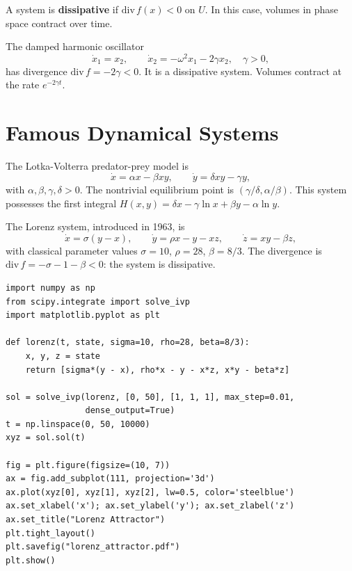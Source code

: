 \begin{definition}
A system is \textbf{dissipative} if $\mathrm{div}\, f(x) < 0$ on $U$.
In this case, volumes in phase space contract over time.
\end{definition}

\begin{example}
The damped harmonic oscillator
\[
    \dot{x}_1 = x_2, \qquad \dot{x}_2 = -\omega^2 x_1 - 2\gamma x_2, \quad \gamma > 0,
\]
has divergence $\mathrm{div}\, f = -2\gamma < 0$. It is a dissipative system.
Volumes contract at the rate $e^{-2\gamma t}$.
\end{example}

\section{Famous Dynamical Systems}

\begin{example}
The Lotka-Volterra predator-prey model is
\[
    \dot{x} = \alpha x - \beta xy, \qquad \dot{y} = \delta xy - \gamma y,
\]
with $\alpha, \beta, \gamma, \delta > 0$. The nontrivial equilibrium point is
$(\gamma/\delta, \alpha/\beta)$. This system possesses the first integral
$H(x,y) = \delta x - \gamma \ln x + \beta y - \alpha \ln y$.
\end{example}

\begin{example}
The Lorenz system, introduced in 1963, is
\[
    \dot{x} = \sigma(y - x), \qquad
    \dot{y} = \rho x - y - xz, \qquad
    \dot{z} = xy - \beta z,
\]
with classical parameter values $\sigma = 10$, $\rho = 28$, $\beta = 8/3$.
The divergence is $\mathrm{div}\, f = -\sigma - 1 - \beta < 0$:
the system is dissipative.
\end{example}

\begin{codeblock}[title=\textbf{Simulation of the Lorenz system}]
\begin{verbatim}
import numpy as np
from scipy.integrate import solve_ivp
import matplotlib.pyplot as plt

def lorenz(t, state, sigma=10, rho=28, beta=8/3):
    x, y, z = state
    return [sigma*(y - x), rho*x - y - x*z, x*y - beta*z]

sol = solve_ivp(lorenz, [0, 50], [1, 1, 1], max_step=0.01,
                dense_output=True)
t = np.linspace(0, 50, 10000)
xyz = sol.sol(t)

fig = plt.figure(figsize=(10, 7))
ax = fig.add_subplot(111, projection='3d')
ax.plot(xyz[0], xyz[1], xyz[2], lw=0.5, color='steelblue')
ax.set_xlabel('x'); ax.set_ylabel('y'); ax.set_zlabel('z')
ax.set_title("Lorenz Attractor")
plt.tight_layout()
plt.savefig("lorenz_attractor.pdf")
plt.show()
\end{verbatim}
\end{codeblock}

